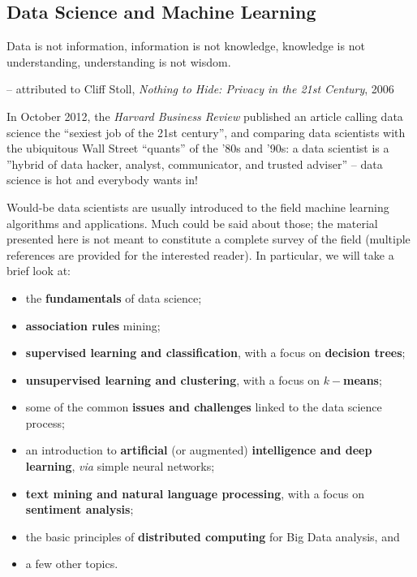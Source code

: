 \subsection{Data Science and Machine Learning}
\label{sec:DSML}
\begin{tcolorbox}[title=From Data to Wisdom]
Data is not information, information is not knowledge, knowledge is not understanding, understanding is not wisdom. \\[-0.6cm]
\begin{flushright}
-- attributed to Cliff Stoll, \textit{Nothing to Hide: Privacy in the 21st Century}, 2006
\end{flushright}
\end{tcolorbox}
\noindent In October 2012, the \textit{Harvard Business Review} published an article calling data science the ``sexiest job of the 21st century'', and comparing data scientists with the ubiquitous Wall Street ``quants'' of the '80s and '90s: a data scientist is a ''hybrid of data hacker, analyst, communicator, and trusted adviser'' \cite{DSML_HBR} -- data science is hot and everybody wants in! \par Would-be data scientists are usually introduced to the field  machine learning algorithms and applications. Much could be said about those; the material presented here is not meant to constitute a complete survey of the field (multiple references are provided for the interested reader).  \newl  
In particular, we will take a brief look at: 
\begin{itemize}[noitemsep]
    \item the \textbf{fundamentals} of data science;
    \item \textbf{association rules} mining;
    \item \textbf{supervised learning and classification}, with a focus on \textbf{decision trees};
    \item \textbf{unsupervised learning and clustering}, with a focus on \textbf{$k-$means};
    \item some of the common \textbf{issues and challenges} linked to the data science process;
    \item an introduction to \textbf{artificial} (or augmented) \textbf{intelligence and deep learning}, \textit{via} simple neural networks;
    \item \textbf{text mining and natural language processing}, with a focus on \textbf{sentiment analysis};
    \item the basic principles of \textbf{distributed computing} for Big Data analysis, and 
    \item a few other topics. 
\end{itemize}
